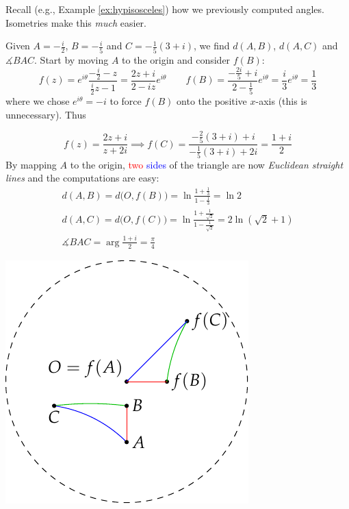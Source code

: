 \goodbreak

Recall (e.g.,{} Example \ref{ex:hypisosceles}) how we previously computed angles. Isometries make this \emph{much} easier. 

\begin{example}{}{}
	Given $A=-\frac i2$, $B=-\frac i5$ and $C=-\frac 1{5}(3+i)$, we find $d(A,B)$, $d(A,C)$ and $\measuredangle BAC$.\smallbreak
	Start by moving $A$ to the origin and consider $f(B)$:
	\[
		f(z)=e^{i\theta}\frac{-\frac i2-z}{\frac i2z-1} =\frac{2z+i}{2-iz}e^{i\theta}
		\qquad f(B)=\frac{-\frac{2i}5+i}{2-\frac 15}e^{i\theta} =\frac i3e^{i\theta}=\frac 13
	\]
	where we chose $e^{i\theta}=-i$ to force $f(B)$ onto the positive $x$-axis (this is unnecessary). Thus\par
	\begin{minipage}[t]{0.64\linewidth}\vspace{-10pt}
		\[
			f(z)=\frac{2z+i}{z+2i}\implies f(C)=\frac{-\frac 25(3+i)+i}{-\frac 15(3+i)+2i}=\frac{1+i}2
		\]
		By mapping $A$ to the origin, \textcolor{red}{two} \textcolor{blue}{sides} of the triangle are now \emph{Euclidean straight lines} and the computations are easy:
		\begin{gather*}
	  	d(A,B)=d\bigl(O,f(B)\bigr)=\ln\frac{1+\frac 13}{1-\frac 13}=\ln 2\\
	  	d(A,C)=d\bigl(O,f(C)\bigr)=\ln\frac{1+\frac 1{\sqrt 2}}{1-\frac 1{\sqrt 2}}=2\ln (\sqrt 2+1)\\[-3pt]
	  	\measuredangle BAC=\arg\frac{1+i}2=\frac\pi 4
		\end{gather*}
	\end{minipage}
	\hfill
	\begin{minipage}[t]{0.34\linewidth}\vspace{-2pt}
		\flushright\includegraphics[scale=0.9]{calc-triangle}
	\end{minipage}
\end{example}



